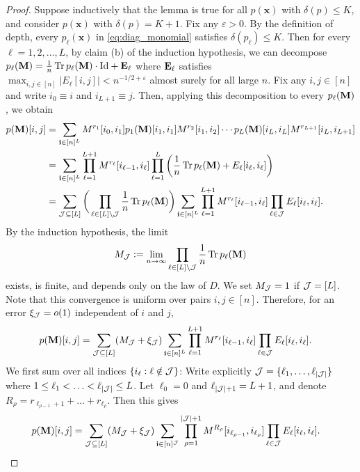 \documentclass[10pt,reqno]{amsart}
\def\bi{\mathbf{i}}
\def\bx{\mathbf{x}}
\def\eps{\varepsilon}
\def\Tr{\operatorname{Tr}}
\begin{document}
\begin{proof}
Suppose inductively that the lemma is true for all $p(\bx)$ with 
$\delta(p) \leq K$, and consider $p(\bx)$ with $\delta(p)=K+1$.
Fix any $\eps>0$. By the definition of depth, every $p_\ell(\bx)$ in
\eqref{eq:diag_monomial} satisfies $\delta(p_\ell)\leq K$.  
Then for every $\ell=1,2,\ldots,L$, by claim (b) of the induction hypothesis,
we can decompose $p_\ell(\bM)=\tfrac{1}{n} \Tr p_\ell(\bM) \cdot\Id+\bE_\ell$
where $\mathbf{E}_\ell$ satisfies $\max_{i,j\in[n]} |E_\ell[i,j]|<n^{-1/2+\eps}$
almost surely for all large $n$.
Fix any $i,j\in[n]$ and write $i_0\equiv i$ and $i_{L+1}\equiv j$.
Then, applying this decomposition to every $p_\ell(\mathbf{M})$, we obtain
\begin{align*}
	p(\bM)[i,j] &= \sum_{\bi\in[n]^L} 
	M^{r_1}[i_0,i_1] p_1(\bM)[i_1,i_1]M^{r_2}[i_1,i_2]
	\cdots p_{L}(\bM)[i_{L},i_{L}]M^{r_{L+1}}[i_L,i_{L+1}]\\
	&= \sum_{\bi\in[n]^L} 
	\prod_{\ell=1}^{L+1} M^{r_\ell}[i_{\ell-1},i_{\ell}]
	\prod_{\ell=1}^L \bigg(\frac{1}{n} \Tr p_\ell(\bM) + E_\ell[i_{\ell}, i_{\ell}]\bigg)\\
	&= \sum_{\cJ\subseteq[L]} \bigg(\prod_{\ell\in[L]\setminus \cJ} 
	\frac{1}{n} \Tr p_\ell(\bM)\bigg)
	\sum_{\bi\in[n]^L} \prod_{\ell=1}^{L+1}
	M^{r_\ell}[i_{\ell-1},i_\ell] \prod_{\ell \in \cJ} E_\ell[i_\ell,i_\ell].
\end{align*}
By the induction hypothesis, the limit
\begin{equation}\label{eq:MJdef}
M_{\cJ}:=\lim_{n\to\infty}\prod_{\ell\in[L]\setminus \cJ} 
\frac{1}{n} \Tr p_\ell(\bM)
\end{equation}
exists, is finite, and depends only on the law of $D$.
We set $M_{\mathcal{J}}=1$ if $\mathcal{J}=[L]$.
Note that this convergence is uniform over pairs $i,j \in [n]$.
Therefore, for an error $\xi_{\mathcal{J}}=o(1)$ independent of $i$ and $j$,
\begin{align*}
	p(\bM)[i,j] &= \sum_{\cJ\subseteq[L]} (M_\cJ+\xi_\cJ)
	\sum_{\bi\in[n]^L} \prod_{\ell=1}^{L+1}
	M^{r_\ell}[i_{\ell-1},i_{\ell}] \prod_{\ell \in \cJ}
    E_\ell[i_\ell,i_\ell].
\end{align*}
We first sum over all indices $\{i_\ell:\ell \notin \mathcal{J}\}$:
Write explicitly 
$\mathcal{J}=\{\ell_1,\ldots,\ell_{|\mathcal{J}|}\}$ where $1\leq \ell_1<\ldots<\ell_{|\mathcal{J}|}\leq L$.
Let $\ell_0=0$ and $\ell_{|\mathcal{J}|+1}=L+1$, and denote
$R_\rho=r_{\ell_{\rho-1}+1}+\ldots+r_{\ell_\rho}$. Then this gives
\begin{align}\label{eq:diag_m_tr}
	p(\bM)[i,j] &= \sum_{\cJ\subseteq[L]} (M_\cJ+\xi_\cJ)
	\sum_{\bi\in[n]^\cJ} \prod_{\rho=1}^{|\cJ|+1}
	M^{R_\rho}[i_{\ell_{\rho-1}},i_{\ell_{\rho}}]
	\prod_{\ell \in\cJ}E_\ell[i_\ell,i_\ell].
\end{align}


\end{proof}
\end{document}
